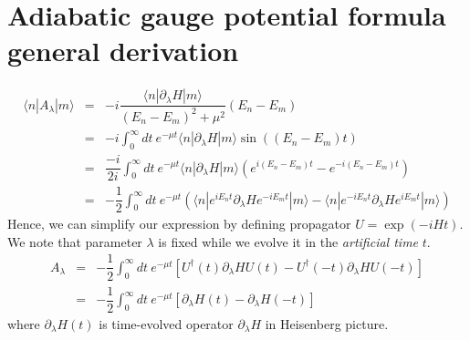 \documentclass[11pt,a4paper]{article}
\begin{document}
%
%
%
%
%
\section{Adiabatic gauge potential formula general derivation}\label{sec.gen_derivation}

\begin{eqnarray}
\langle n | A_{\lambda} | m \rangle &=&   -i \dfrac{\langle n | \partial_{\lambda}H  | m \rangle}{(E_n-E_m)^2 + \mu^2} (E_n-E_m) \\
&=& -i   \int^{\infty}_{0} dt\ e^{-\mu t} \langle n | \partial_{\lambda}H  | m \rangle \sin((E_n-E_m)t) \\
&=& \dfrac{-i }{2i}  \int^{\infty}_{0} dt\ e^{-\mu t} \langle n | \partial_{\lambda}H  | m \rangle \left( e^{i(E_n-E_m)t} - e^{-i(E_n-E_m)t} \right) \\
&=&- \dfrac{ 1}{2}  \int^{\infty}_{0} dt\ e^{-\mu t}  \left(  \langle n | e^{iE_nt} \partial_{\lambda}H   e^{-i E_m t} | m \rangle  -  \langle n |e^{-i E_n t}  \partial_{\lambda}H  e^{ i E_mt} | m \rangle  \right) 
\end{eqnarray}
Hence, we can simplify our expression by defining propagator  $U= \exp(-i H t)$. We note that parameter $\lambda$ is fixed while we evolve it in the \textit{artificial time} $t$.
\begin{eqnarray}
A_{\lambda} &=& -\dfrac{1}{2 }\int_0^{\infty} dt\ e^{-\mu t} [U^{\dagger}(t ) \partial_{\lambda} H U(t ) - U^{\dagger}(-t ) \partial_{\lambda}H U(-t )]  \\
&=& -\dfrac{1}{2 }\int_0^{\infty} dt\ e^{-\mu t} [ \partial_{\lambda} H (t) -  \partial_{\lambda}H (-t )  ]  
\end{eqnarray}
where $\partial_{\lambda}H (t)$ is time-evolved operator $\partial_{\lambda}H$ in Heisenberg picture.
\end{document}
